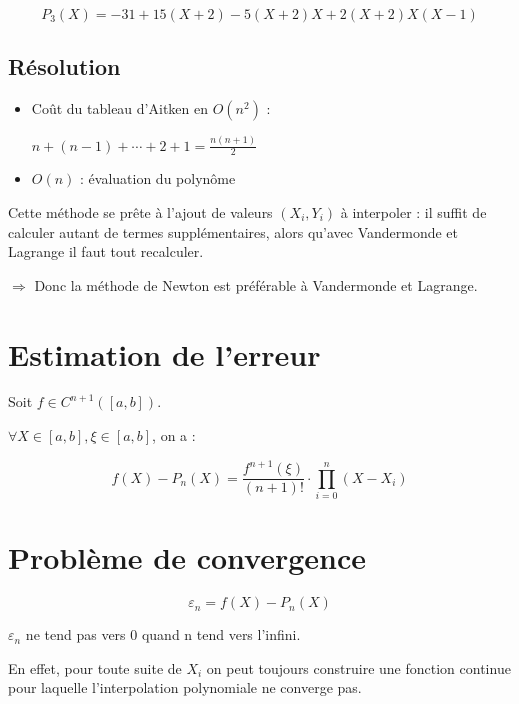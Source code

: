 \begin{equation}
P_3(X) = -31 + 15 (X + 2) - 5 (X + 2) X + 2 (X + 2) X (X - 1)
\end{equation}

\subsection* {Résolution}

\begin{itemize}
\item Coût du tableau d'Aitken en $O(n^2)$ :

$n + (n - 1) + \cdots + 2 + 1 = \frac{n (n + 1)}{2}$
\item $O(n)$ : évaluation du polynôme
\end{itemize}

\bigbreak
Cette méthode se prête à l'ajout de valeurs $(X_i, Y_i)$ à interpoler : il suffit de calculer autant de termes supplémentaires, alors qu'avec Vandermonde et Lagrange il faut tout recalculer.

\bigbreak
$\Rightarrow$ Donc la méthode de Newton est préférable à Vandermonde et Lagrange.



\section {Estimation de l'erreur}

Soit $f \in C^{n + 1}([a,b])$.

$\forall X \in [a,b], \xi \in [a,b]$, on a :

\begin{equation}
f(X) - P_n(X) = \frac{f^{n + 1}(\xi)}{(n + 1)!} \cdot \prod_{i = 0}^n (X - X_i)
\end{equation}


\section {Problème de convergence}
\begin{equation}
\varepsilon_n = f(X) - P_n(X)
\end{equation}


$\varepsilon_n$ ne tend pas vers 0 quand n tend vers l'infini.

En effet, pour toute suite de $X_i$ on peut toujours construire une fonction continue pour laquelle l'interpolation polynomiale ne converge pas.


